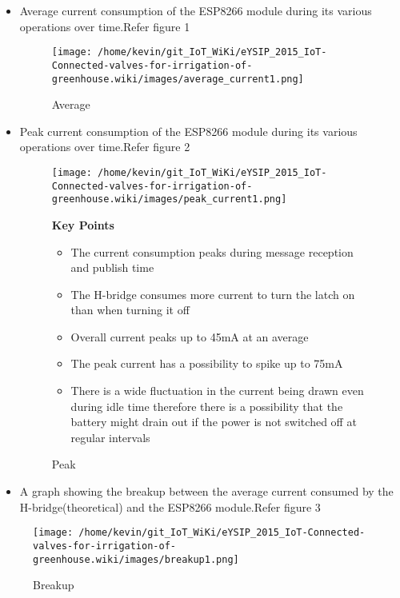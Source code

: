 \documentclass[16pt]{article}
\begin{document}
\begin{itemize}

\item
  Average current consumption of the ESP8266 module during its various
  operations over time.Refer figure 1 


\begin{figure}
\texttt{[image: /home/kevin/git\_IoT\_WiKi/eYSIP\_2015\_IoT-Connected-valves-for-irrigation-of-greenhouse.wiki/images/average\_current1.png]}
\caption{Average}
\end{figure}


\item
  Peak current consumption of the ESP8266 module during its various
  operations over time.Refer figure 2 

\begin{figure}
\texttt{[image: /home/kevin/git\_IoT\_WiKi/eYSIP\_2015\_IoT-Connected-valves-for-irrigation-of-greenhouse.wiki/images/peak\_current1.png]}
\caption{Peak}
\textbf{Key Points}

  \begin{itemize}

  \item
    The current consumption peaks during message reception and publish
    time
  \item
    The H-bridge consumes more current to turn the latch on than when
    turning it off
  \item
    Overall current peaks up to 45mA at an average
  \item
    The peak current has a possibility to spike up to 75mA
  \item
    There is a wide fluctuation in the current being drawn even during
    idle time therefore there is a possibility that the battery might
    drain out if the power is not switched off at regular intervals
  \end{itemize}
\end{figure}

  
\item
  A graph showing the breakup between the average current consumed by
  the H-bridge(theoretical) and the ESP8266 module.Refer figure 3
\end{itemize}

\begin{figure}
\texttt{[image: /home/kevin/git\_IoT\_WiKi/eYSIP\_2015\_IoT-Connected-valves-for-irrigation-of-greenhouse.wiki/images/breakup1.png]}
\caption{Breakup}
\end{figure}
  
\end{document}
